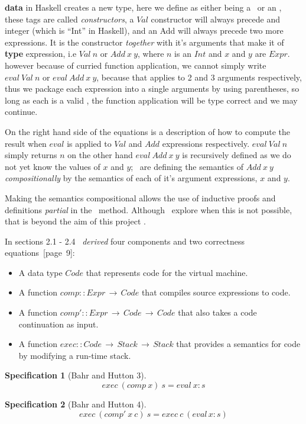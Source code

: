 \documentclass {article}
\begin{document}
\textbf{data} in Haskell creates a new type,
here we define \expr as either being a \val\
or an \add, these tags are called \emph{constructors},
a $Val$ constructor will always precede and integer
(which is ``Int'' in Haskell),
and an Add will always precede two more expressions.
It is the constructor \emph{together} with 
it's arguments that make it of \textbf{type}
expression, i.e $Val\ n$ or $Add\ x\ y$,
where $n$ is an $Int$ and $x$ and $y$ are $Expr$.
however because of curried function application,
we cannot simply write 
$eval\ Val\ n$ or $eval\ Add\ x\ y$,
because that applies \eval to 2 and 3 arguments respectively,
thus we package each expression into a single arguments
by using parentheses, so long as each is a
valid \expr, the function application will be type correct
and we may continue.

On the right hand side of the equations is a
description of how to compute 
the result when $eval$ is applied to $Val$ and
$Add$ expressions respectively.
$eval\ Val\ n$ simply returns $n$
on the other hand $eval\ Add\ x\ y$
is recursively defined as we do not yet know
the values of $x$ and $y$; \BH\ are defining the
semantics of $Add\ x\ y$ \emph{compositionally} by the 
semantics of each of it's argument expressions, $x$ and $y$.

Making the semantics compositional allows
the use of inductive proofs and definitions \emph{partial}
in the \BH\ method.
Although \BH\ explore
when this is not possible, that is beyond
the aim of this project \cite{bandh}.

In sections 2.1 - 2.4 \BH\
\emph{derived} four 
components and two correctness equations\cite{bandh}~[page~9]:

\begin{itemize}
	\item A data type $Code$ that represents
		code for the virtual machine.
	\item A function \( comp::Expr \, \rightarrow \, Code \)
		that compiles source expressions to code.
	\item A function 
		\( comp'::Expr \, \rightarrow \, Code \, \rightarrow \, Code \)
		that also takes a code continuation as input.
	\item A function
		\( exec::Code \, \rightarrow \, Stack \, \rightarrow \, Stack \)
		that provides a semantics for code by modifying a run-time stack.
\end{itemize}

\newtheorem{spec}{Specification}
\begin{spec}[Bahr and Hutton 3]
\thlabel{spec1}
	\[ exec\  (comp\  x)\  s = eval\  x:s \]
\end{spec}
\begin{spec}[Bahr and Hutton 4]
	\[ exec\  (comp'\  x\  c)\ s = exec\  c\  (eval \, x:s) \]
\end{spec}
\end{document}
